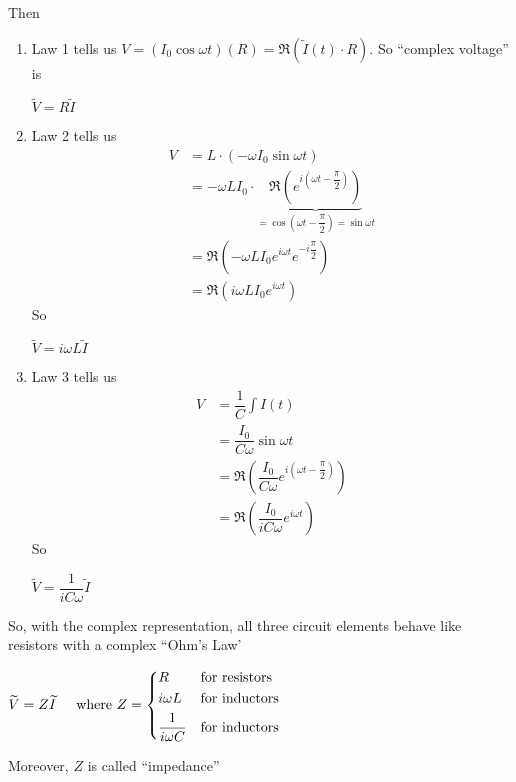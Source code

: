 \documentclass[12pt,titlepage]{article}
\begin{document}
Then \begin{enumerate}
	\item Law 1 tells us $V = (I_0\cos \omega t)(R) = \Re(\widetilde{I}(t)\cdot R)$. So ``complex voltage'' is \begin{tcolorbox}[hbox, before=\par\smallskip\centering]
		$\tilde{V} = R\widetilde{I}$
	\end{tcolorbox}
	\item Law 2 tells us \begin{align*}
		V&= L\cdot (-\omega I_0\sin\omega t)\\
		&=-\omega LI_0\cdot \underbrace{\Re(e^{i(\omega t - \dfrac{\pi}{2})})}_{= \cos(\omega t - \dfrac{\pi}{2}) = \sin \omega t}\\
		&=\Re(-\omega L I_0 e^{i\omega t} e^{-i \dfrac{\pi}{2}})\\
		&=\Re(i\omega LI_0e^{i\omega t})
	\end{align*}
	So \begin{tcolorbox}[hbox, before=\par\smallskip\centering]
		$\widetilde{V} = i\omega L\widetilde{I}$
	\end{tcolorbox}
	\item Law 3 tells us \begin{align*}
		V &= \dfrac{1}{C}\int I(t)\\
		&= \dfrac{I_0}{C\omega} \sin \omega t\\
		&=\Re(\dfrac{I_0}{C\omega}e^{i(\omega t - \dfrac{\pi}{2})})\\
		&=\Re(\dfrac{I_0}{iC\omega}e^{i\omega t})
	\end{align*}
	So \begin{tcolorbox}[hbox, before=\par\smallskip\centering]
		$\widetilde{V} = \dfrac{1}{iC\omega}\widetilde{I}$
	\end{tcolorbox}
\end{enumerate}
So, with the complex representation, all three circuit elements behave like resistors with a complex ``Ohm's Law'
\begin{tcolorbox}[hbox, before=\par\smallskip\centering]
	$\widetilde{V} = Z\widetilde{I} \;\;\;\;\text{ where } Z = \begin{dcases}
		R & \text{for resistors}\\
		i\omega L & \text{for inductors}\\
		\dfrac{1}{i\omega C} & \text{for inductors}
	\end{dcases}$
\end{tcolorbox}
Moreover, $Z$ is called ``impedance''
\end{document}
